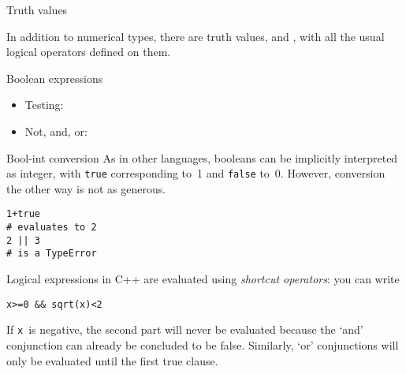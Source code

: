 \begin{comment}
  \begin{exercise}
    \label{ex:cin-cout3np1}
    Write a program that :
    \begin{itemize}
    \item displays the message \n{Type a number},
    \item accepts an integer number from you (use~\lstinline{cin}),
    \item makes another variable that is three times that integer plus one,
    \item and then prints out the second variable.
    \end{itemize}
  \end{exercise}
\end{comment}

 {Truth values}

In addition to numerical types, there are truth values,
 and , with all the usual logical
operators defined on them.

\begin{block}{Boolean expressions}
  \label{sl:bool-expr}
  \begin{itemize}
  \item Testing: \n{== != < > <= >=}
  \item Not, and, or:   \n{! && ||}
  \end{itemize}
\end{block}

\begin{block}{Bool-int conversion}
  As in other languages, booleans can be implicitly interpreted as
  integer, with \lstinline{true} corresponding to~1 and
  \lstinline{false} to~0. However, conversion the other way is not as
  generous.
\begin{lstlisting}
1+true
# evaluates to 2
2 || 3
# is a TypeError
\end{lstlisting}
\end{block}

Logical expressions in C++ are evaluated using
\emph{shortcut operators}: you can write
\begin{lstlisting}
x>=0 && sqrt(x)<2
\end{lstlisting}
If \lstinline{x}~is negative, the second part will never be evaluated because
the `and' conjunction can already be concluded to be false.
Similarly, `or' conjunctions will only be evaluated until the first
true clause.

